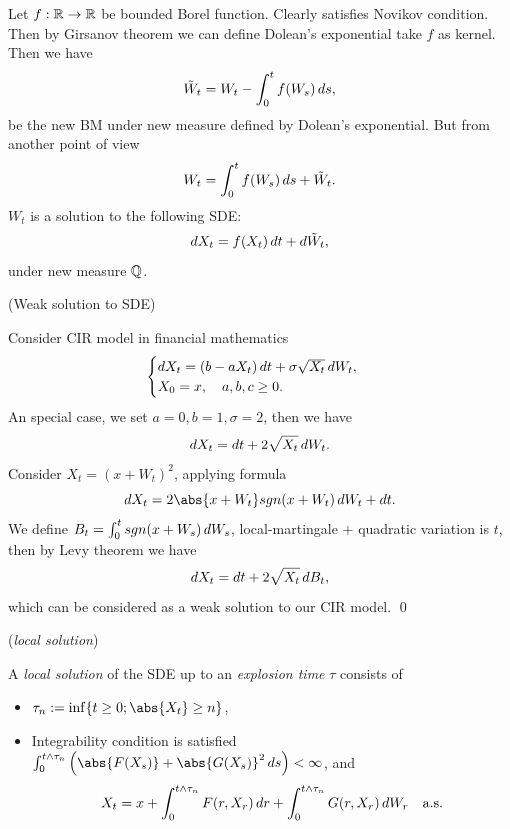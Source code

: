 \begin{example}
Let $f: \mathbb{R} \rightarrow \mathbb{R}$ be bounded Borel function. Clearly satisfies Novikov condition. Then by Girsanov theorem we can define Dolean's exponential take $f$ as kernel. Then we have
\begin{equation*}
    \tilde{W}_t = W_t - \int_0^t f(W_s) \mathop{}\!d s,
\end{equation*}
be the new BM under new measure defined by Dolean's exponential. But from another point of view
\begin{equation*}
    W_t = \int_0^t f(W_s) \mathop{}\!d s + \tilde{W}_t.
\end{equation*} 
$W_t$ is a solution to the following SDE:
\begin{equation*}
    \mathop{}\!d X_t = f(X_t) \mathop{}\!d t + \mathop{}\!d \tilde{W}_t,
\end{equation*}
under new measure $\mathbb{Q}$.
\end{example}

\begin{example}{(Weak solution to SDE)}

Consider CIR model in financial mathematics 
\begin{equation*}
    \begin{cases}
        \mathop{}\!d X_t = (b-aX_t) \mathop{}\!d t + \sigma \sqrt{X_t} \mathop{}\!d W_t, \\
        X_0 = x,\quad  a,b,c \geq 0.
    \end{cases}
\end{equation*}
An special case, we set $a = 0, b = 1, \sigma = 2$, then we have
\begin{equation*}
    \mathop{}\!d X_t = \mathop{}\!d t + 2 \sqrt{X_t} \mathop{}\!d W_t.
\end{equation*}
Consider $X_t = (x + W_t)^2$, applying \ito formula
\begin{equation*}
    \diff X_t = 2 \abs{x + W_t} sgn(x + W_t) \diff W_t + \diff t.
\end{equation*}
We define $B_t = \int_0^t sgn(x + W_s) \mathop{}\!d W_s$, local-martingale + quadratic variation is $t$, then by Levy theorem we have 
\begin{equation*}
    \mathop{}\!d X_t = \mathop{}\!d t + 2 \sqrt{X_t} \mathop{}\!d B_t,
\end{equation*} which can be considered as a weak solution to our CIR model. 
\qed
\end{example}

\begin{dfn}\label{localslt}{(\textit{local solution})}

A \textit{local solution} of the SDE up to an \textit{explosion time} $\tau$ consists of
\begin{itemize}
    \item $\tau_n := \inf\{t \geq 0; \abs{X_t} \geq n\}$,
    \item Integrability condition is satisfied $\int_0^{t\wedge \tau_n} \left(\abs{F(X_s)}+\abs{G(X_s)}^2 \diff s \right) <\infty$, and
\begin{equation*}
    X_t = x + \int_0^{t\wedge \tau_n} F(r,X_r) \mathop{}\!d r+\int_0^{t\wedge \tau_n} G(r,X_r) \mathop{}\!d W_r \quad \text{a.s.}
\end{equation*}
\end{itemize}
\end{dfn}

